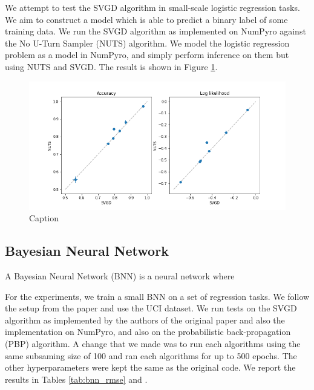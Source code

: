 We attempt to test the SVGD algorithm in small-scale logistic regression tasks. We aim to construct a model which is able to predict a binary label of some training data. We run the SVGD algorithm as implemented on NumPyro against the No U-Turn Sampler (NUTS) algorithm. We model the logistic regression problem as a model in NumPyro, and simply perform inference on them but using NUTS and SVGD. The result is shown in Figure \ref{fig:logist_small}.



\begin{figure}[h]
    \centering
    \includegraphics[width=\textwidth]{figs/logistic_svgd_nuts.png}
    \caption{Caption}
    \label{fig:logist_small}
\end{figure}

\subsection{Bayesian Neural Network}

A Bayesian Neural Network (BNN) is a neural network where 

For the experiments, we train a small BNN on a set of regression tasks. We follow the setup from the paper and use the UCI dataset. We run tests on the SVGD algorithm as implemented by the authors of the original paper and also the implementation on NumPyro, and also on the probabilistic back-propagation (PBP) algorithm. A change that we made was to run each algorithms using the same subsaming size of 100 and ran each algorithms for up to 500 epochs. The other hyperparameters were kept the same as the original code. We report the results in Tables \ref{tab:bnn_rmse} and . 

